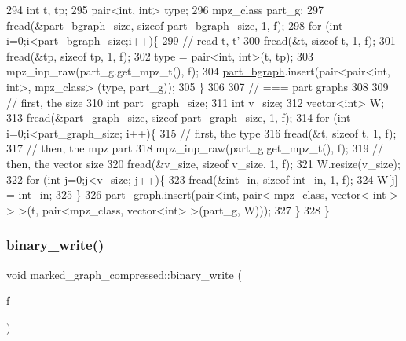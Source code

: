 \begin{DoxyCode}
294   \textcolor{keywordtype}{int} t, tp;
295   pair<int, int> type; 
296   mpz\_class part\_g; 
297   fread(&part\_bgraph\_size, \textcolor{keyword}{sizeof} part\_bgraph\_size, 1, f);
298   \textcolor{keywordflow}{for} (\textcolor{keywordtype}{int} i=0;i<part\_bgraph\_size;i++)\{
299     \textcolor{comment}{// read t, t'}
300     fread(&t, \textcolor{keyword}{sizeof} t, 1, f);
301     fread(&tp, \textcolor{keyword}{sizeof} tp, 1, f);
302     type = pair<int, int>(t, tp);
303     mpz\_inp\_raw(part\_g.get\_mpz\_t(), f);
304     \hyperlink{classmarked__graph__compressed_a7b3267063fba30b45eb21b3ba4e07536}{part\_bgraph}.insert(pair<pair<int, int>, mpz\_class> (type, part\_g));
305   \}
306 
307   \textcolor{comment}{// === part graphs}
308 
309   \textcolor{comment}{// first, the size}
310   \textcolor{keywordtype}{int} part\_graph\_size;
311   \textcolor{keywordtype}{int} v\_size;
312   vector<int> W; 
313   fread(&part\_graph\_size, \textcolor{keyword}{sizeof} part\_graph\_size, 1, f);
314   \textcolor{keywordflow}{for} (\textcolor{keywordtype}{int} i=0;i<part\_graph\_size; i++)\{
315     \textcolor{comment}{// first, the type}
316     fread(&t, \textcolor{keyword}{sizeof} t, 1, f);
317     \textcolor{comment}{// then, the mpz part}
318     mpz\_inp\_raw(part\_g.get\_mpz\_t(), f);
319     \textcolor{comment}{// then, the vector size}
320     fread(&v\_size, \textcolor{keyword}{sizeof} v\_size, 1, f);
321     W.resize(v\_size);
322     \textcolor{keywordflow}{for} (\textcolor{keywordtype}{int} j=0;j<v\_size; j++)\{
323       fread(&int\_in, \textcolor{keyword}{sizeof} int\_in, 1, f);
324       W[j] = int\_in;
325     \}
326     \hyperlink{classmarked__graph__compressed_ae179a4737e6eab905c18a94d44ef64b7}{part\_graph}.insert(pair<\textcolor{keywordtype}{int}, pair< mpz\_class, vector< int > > >(t, pair<mpz\_class, vector<int>
       >(part\_g, W)));
327   \}
328 \}
\end{DoxyCode}
\mbox{\label{classmarked__graph__compressed_ab9cdb7fc43badd58fb5202f74ffac723}} 
\subsubsection{\texorpdfstring{binary\+\_\+write()}{binary\_write()}}
{\footnotesize\ttfamily void marked\+\_\+graph\+\_\+compressed\+::binary\+\_\+write (\begin{DoxyParamCaption}\item[{F\+I\+LE $\ast$}]{f }\end{DoxyParamCaption})}




